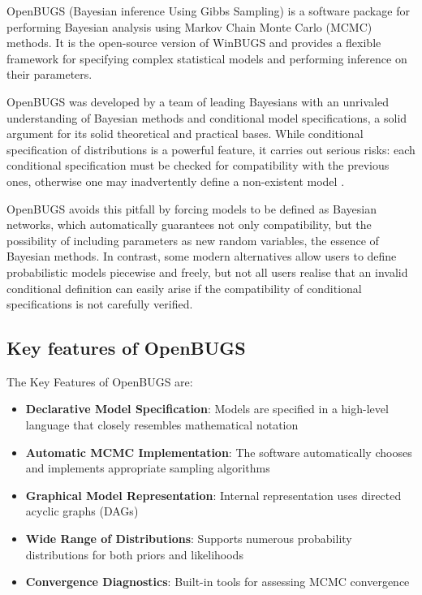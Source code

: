 OpenBUGS (Bayesian inference Using Gibbs Sampling) is a software package for performing Bayesian analysis using Markov Chain Monte Carlo (MCMC) methods. It is the open-source version of WinBUGS and provides a flexible framework for specifying complex statistical models and performing inference on their parameters.

OpenBUGS was developed by a team of leading Bayesians with an unrivaled understanding of Bayesian methods and conditional model specifications, a solid argument for its solid theoretical and practical bases. While conditional specification of distributions is a powerful feature, it carries out serious risks: each conditional specification must be checked for compatibility with the previous ones, otherwise one may inadvertently define a non-existent model \cite{ArnoldCS:92a,ArnoldCS:99}.

OpenBUGS avoids this pitfall by forcing models to be defined as Bayesian networks, which automatically guarantees not only compatibility, but the possibility of including parameters as new random variables, the essence of Bayesian methods. In contrast, some modern alternatives allow users to define probabilistic models piecewise and freely, but not all users realise that an invalid conditional definition can easily arise if the compatibility of conditional specifications is not carefully verified.

\subsection{Key features of OpenBUGS}

The Key Features of OpenBUGS are:
\begin{itemize}
    \item \textbf{Declarative Model Specification}: Models are specified in a high-level language that closely resembles mathematical notation
    \item \textbf{Automatic MCMC Implementation}: The software automatically chooses and implements appropriate sampling algorithms
    \item \textbf{Graphical Model Representation}: Internal representation uses directed acyclic graphs (DAGs)
    \item \textbf{Wide Range of Distributions}: Supports numerous probability distributions for both priors and likelihoods
    \item \textbf{Convergence Diagnostics}: Built-in tools for assessing MCMC convergence
\end{itemize}

